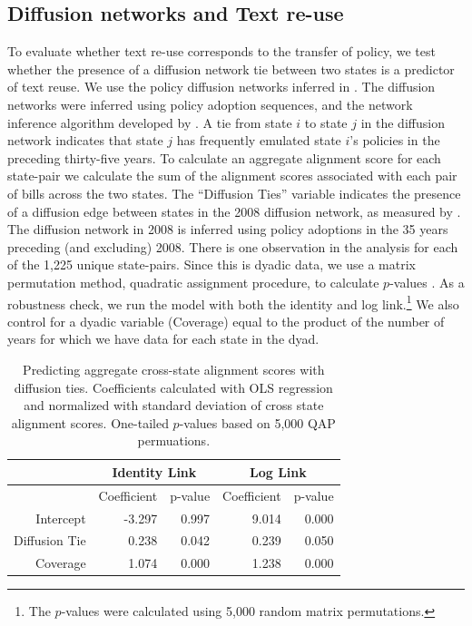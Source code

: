 \documentclass[12pt]{article} %
\begin{document}
\subsection{Diffusion networks and Text re-use}

To evaluate whether text re-use corresponds to the transfer of policy, we test whether the presence of a diffusion network tie between two states is a predictor of text reuse. We use the policy diffusion networks inferred in \citet{desmarais2015}. The diffusion networks were inferred using policy adoption sequences, and the network inference algorithm developed by \citet{gomez2010inferring}. A tie from state $i$ to state $j$ in the diffusion network indicates that state $j$ has frequently emulated state $i$'s policies in the preceding thirty-five years. To calculate an aggregate alignment score for each state-pair we calculate the sum of the alignment scores associated with each pair of bills across the two states. The ``Diffusion Ties'' variable indicates the presence of a diffusion edge between states in the 2008 diffusion network, as measured by \citet{desmarais2015}. The diffusion network in 2008 is inferred using policy adoptions in the 35 years preceding (and excluding) 2008.  There is one observation in the analysis for each of the 1,225 unique state-pairs. Since this is dyadic data, we use a matrix permutation method, quadratic assignment procedure, to calculate $p$-values \citep{krackhardt1988}. As a robustness check, we run the model with both the identity and log link.\footnote{The $p$-values were calculated using 5,000 random matrix permutations.} We also control for a dyadic variable (Coverage) equal to the product of the number of years for which we have data for each state in the dyad.

\begin{table}[ht]
\centering
\begin{tabular}{rrrrr}
\hline
& \multicolumn{2}{c}{Identity Link} & \multicolumn{2}{c}{Log Link} \\
  \hline
    & Coefficient & p-value & Coefficient & p-value \\
    Intercept & -3.297 & 0.997 & 9.014 & 0.000 \\ 
    Diffusion Tie & 0.238 & 0.042 & 0.239 & 0.050 \\ 
    Coverage & 1.074 & 0.000 & 1.238 & 0.000 \\ 
\hline
\end{tabular}
\caption{Predicting aggregate cross-state alignment scores with diffusion ties.
Coefficients calculated with OLS regression and normalized with standard
deviation of cross state alignment scores. One-tailed $p$-values based on 5,000 QAP permuations.}
\label{tab:qap.diffusion}
\end{table}
\end{document}
